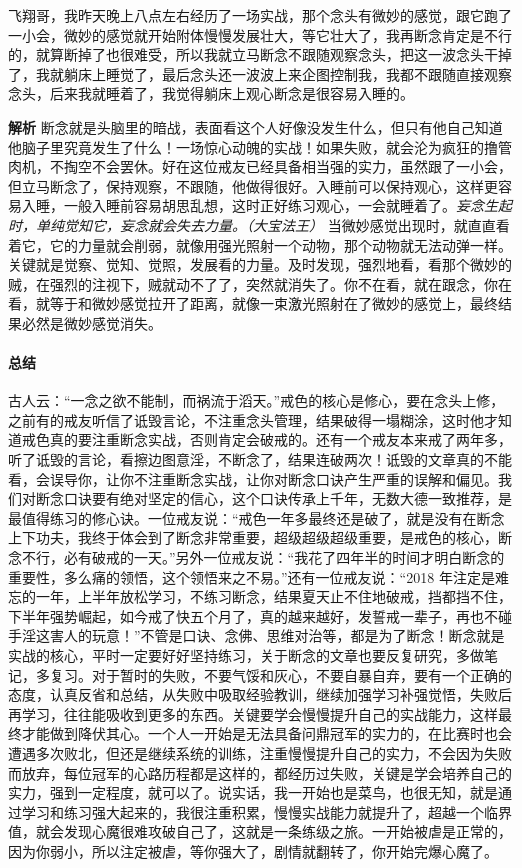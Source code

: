 \begin{case}[如何战胜微妙的感觉]
    飞翔哥，我昨天晚上八点左右经历了一场实战，那个念头有微妙的感觉，跟它跑了一小会，微妙的感觉就开始附体慢慢发展壮大，等它壮大了，我再断念肯定是不行的，就算断掉了也很难受，所以我就立马断念不跟随观察念头，把这一波念头干掉了，我就躺床上睡觉了，最后念头还一波波上来企图控制我，我都不跟随直接观察念头，后来我就睡着了，我觉得躺床上观心断念是很容易入睡的。

    \textbf{解析} 断念就是头脑里的暗战，表面看这个人好像没发生什么，但只有他自己知道他脑子里究竟发生了什么！一场惊心动魄的实战！如果失败，就会沦为疯狂的撸管肉机，不掏空不会罢休。好在这位戒友已经具备相当强的实力，虽然跟了一小会，但立马断念了，保持观察，不跟随，他做得很好。入睡前可以保持观心，这样更容易入睡，一般入睡前容易胡思乱想，这时正好练习观心，一会就睡着了。\textit{妄念生起时，单纯觉知它，妄念就会失去力量。（大宝法王）} 当微妙感觉出现时，就直直看着它，它的力量就会削弱，就像用强光照射一个动物，那个动物就无法动弹一样。关键就是觉察、觉知、觉照，发展看的力量。及时发现，强烈地看，看那个微妙的贼，在强烈的注视下，贼就动不了了，突然就消失了。你不在看，就在跟念，你在看，就等于和微妙感觉拉开了距离，就像一束激光照射在了微妙的感觉上，最终结果必然是微妙感觉消失。
\end{case}

\paragraph*{总结}

古人云：“一念之欲不能制，而祸流于滔天。”戒色的核心是修心，要在念头上修，之前有的戒友听信了诋毁言论，不注重念头管理，结果破得一塌糊涂，这时他才知道戒色真的要注重断念实战，否则肯定会破戒的。还有一个戒友本来戒了两年多，听了诋毁的言论，看擦边图意淫，不断念了，结果连破两次！诋毁的文章真的不能看，会误导你，让你不注重断念实战，让你对断念口诀产生严重的误解和偏见。我们对断念口诀要有绝对坚定的信心，这个口诀传承上千年，无数大德一致推荐，是最值得练习的修心诀。一位戒友说：“戒色一年多最终还是破了，就是没有在断念上下功夫，我终于体会到了断念非常重要，超级超级超级重要，是戒色的核心，断念不行，必有破戒的一天。”另外一位戒友说：“我花了四年半的时间才明白断念的重要性，多么痛的领悟，这个领悟来之不易。”还有一位戒友说：“2018 年注定是难忘的一年，上半年放松学习，不练习断念，结果夏天止不住地破戒，挡都挡不住，下半年强势崛起，如今戒了快五个月了，真的越来越好，发誓戒一辈子，再也不碰手淫这害人的玩意！”不管是口诀、念佛、思维对治等，都是为了断念！断念就是实战的核心，平时一定要好好坚持练习，关于断念的文章也要反复研究，多做笔记，多复习。对于暂时的失败，不要气馁和灰心，不要自暴自弃，要有一个正确的态度，认真反省和总结，从失败中吸取经验教训，继续加强学习补强觉悟，失败后再学习，往往能吸收到更多的东西。关键要学会慢慢提升自己的实战能力，这样最终才能做到降伏其心。一个人一开始是无法具备问鼎冠军的实力的，在比赛时也会遭遇多次败北，但还是继续系统的训练，注重慢慢提升自己的实力，不会因为失败而放弃，每位冠军的心路历程都是这样的，都经历过失败，关键是学会培养自己的实力，强到一定程度，就可以了。说实话，我一开始也是菜鸟，也很无知，就是通过学习和练习强大起来的，我很注重积累，慢慢实战能力就提升了，超越一个临界值，就会发现心魔很难攻破自己了，这就是一条练级之旅。一开始被虐是正常的，因为你弱小，所以注定被虐，等你强大了，剧情就翻转了，你开始完爆心魔了。

